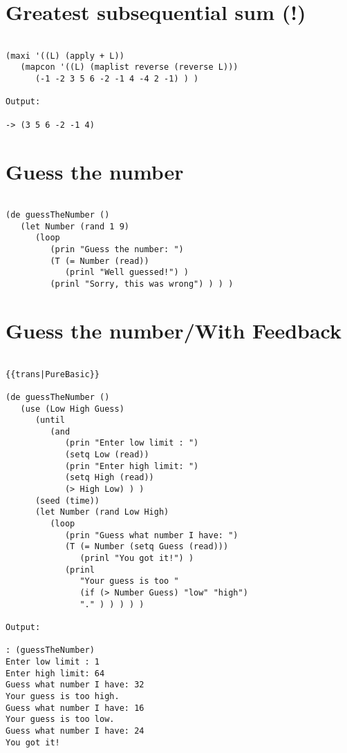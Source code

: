\section*{Greatest subsequential sum (!)}

\begin{verbatim}

(maxi '((L) (apply + L))
   (mapcon '((L) (maplist reverse (reverse L)))
      (-1 -2 3 5 6 -2 -1 4 -4 2 -1) ) )

Output:

-> (3 5 6 -2 -1 4)

\end{verbatim}

\section*{Guess the number}

\begin{verbatim}

(de guessTheNumber ()
   (let Number (rand 1 9)
      (loop
         (prin "Guess the number: ")
         (T (= Number (read))
            (prinl "Well guessed!") )
         (prinl "Sorry, this was wrong") ) ) )

\end{verbatim}

\section*{Guess the number/With Feedback}

\begin{verbatim}

{{trans|PureBasic}}

(de guessTheNumber ()
   (use (Low High Guess)
      (until
         (and
            (prin "Enter low limit : ")
            (setq Low (read))
            (prin "Enter high limit: ")
            (setq High (read))
            (> High Low) ) )
      (seed (time))
      (let Number (rand Low High)
         (loop
            (prin "Guess what number I have: ")
            (T (= Number (setq Guess (read)))
               (prinl "You got it!") )
            (prinl
               "Your guess is too "
               (if (> Number Guess) "low" "high")
               "." ) ) ) ) )

Output:

: (guessTheNumber)
Enter low limit : 1
Enter high limit: 64
Guess what number I have: 32
Your guess is too high.
Guess what number I have: 16
Your guess is too low.
Guess what number I have: 24
You got it!

\end{verbatim}

